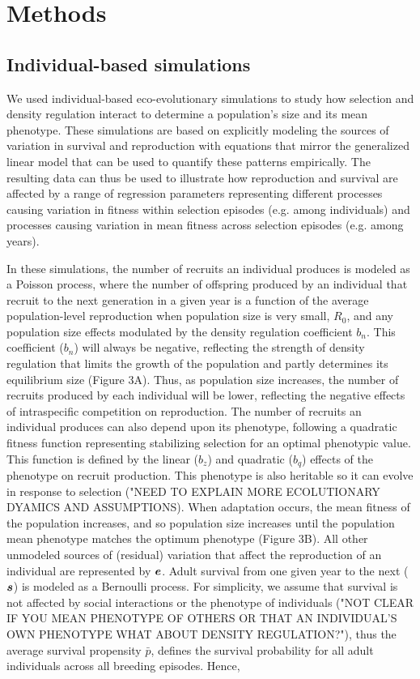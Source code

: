 \documentclass{article}
\begin{document}
\section{Methods}
\subsection{Individual-based simulations}

We used individual-based eco-evolutionary simulations to study how selection and density regulation interact to determine a population's size and its mean phenotype. These simulations are based on explicitly modeling the sources of variation in survival and reproduction with equations that mirror the generalized linear model that can be used to quantify these patterns empirically. The resulting data can thus be used to illustrate how reproduction and survival are affected by a range of regression parameters representing different processes causing variation in fitness within selection episodes (e.g. among individuals) and processes causing variation in mean fitness across selection episodes (e.g. among years). 

In these simulations, the number of recruits an individual produces is modeled as a Poisson process, where the number of offspring produced by an individual that recruit to the next generation in a given year is a function of the average population-level reproduction when population size is very small, $R_0$, and any population size effects modulated by the density regulation coefficient $b_{n}$. This coefficient ($b_{n}$) will always be negative, reflecting the strength of density regulation that limits the growth of the population and partly determines its equilibrium size (Figure 3A). Thus, as population size increases, the number of recruits produced by each individual will be lower, reflecting the negative effects of intraspecific competition on reproduction. The number of recruits an individual produces can also depend upon its phenotype, following a quadratic fitness function representing stabilizing selection for an optimal phenotypic value. This function is defined by the linear ($b_z$) and quadratic ($b_q$) effects of the phenotype on recruit production. This phenotype is also heritable so it can evolve in response to selection ("NEED TO EXPLAIN MORE ECOLUTIONARY DYAMICS AND ASSUMPTIONS). When adaptation occurs, the mean fitness of the population increases, and so population size increases until the population mean phenotype matches the optimum phenotype (Figure 3B). All other unmodeled sources of (residual) variation that affect the reproduction of an individual are represented by $\vectorsym{e}$. Adult survival from one given year to the next ($\vectorsym{s}$) is modeled as a Bernoulli process. For simplicity, we assume that survival is not affected by social interactions or the phenotype of individuals ("NOT CLEAR IF YOU MEAN PHENOTYPE OF OTHERS OR THAT AN INDIVIDUAL'S OWN PHENOTYPE WHAT ABOUT DENSITY REGULATION?"), thus the average survival propensity $\bar{p}$, defines the survival probability for all adult individuals across all breeding episodes. Hence,
\end{document}
